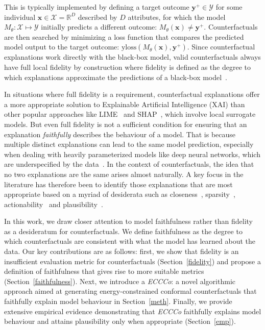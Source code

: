 \documentclass[letterpaper]{article} %
\begin{document}
This is typically implemented by defining a target outcome $\mathbf{y}^+ \in \mathcal{Y}$ for some individual $\mathbf{x} \in \mathcal{X}=\mathbb{R}^D$ described by $D$ attributes, for which the model $M_{\theta}:\mathcal{X}\mapsto\mathcal{Y}$ initially predicts a different outcome: $M_{\theta}(\mathbf{x})\ne \mathbf{y}^+$. Counterfactuals are then searched by minimizing a loss function that compares the predicted model output to the target outcome: $\text{yloss}(M_{\theta}(\mathbf{x}),\mathbf{y}^+)$. Since counterfactual explanations work directly with the black-box model, valid counterfactuals always have full local fidelity by construction where fidelity is defined as the degree to which explanations approximate the predictions of a black-box model~\citep{molnar2022interpretable}. 

In situations where full fidelity is a requirement, counterfactual explanations offer a more appropriate solution to Explainable Artificial Intelligence (XAI) than other popular approaches like LIME~\citep{ribeiro2016why} and SHAP~\citep{lundberg2017unified}, which involve local surrogate models. But even full fidelity is not a sufficient condition for ensuring that an explanation \textit{faithfully} describes the behaviour of a model. That is because multiple distinct explanations can lead to the same model prediction, especially when dealing with heavily parameterized models like deep neural networks, which are underspecified by the data~\citep{wilson2020case}. In the context of counterfactuals, the idea that no two explanations are the same arises almost naturally. A key focus in the literature has therefore been to identify those explanations that are most appropriate based on a myriad of desiderata such as closeness~\citep{wachter2017counterfactual}, sparsity~\citep{schut2021generating}, actionability~\citep{ustun2019actionable} and plausibility~\citep{joshi2019realistic}. 

In this work, we draw closer attention to model faithfulness rather than fidelity as a desideratum for counterfactuals. We define faithfulness as the degree to which counterfactuals are consistent with what the model has learned about the data. Our key contributions are as follows: first, we show that fidelity is an insufficient evaluation metric for counterfactuals (Section~\ref{fidelity}) and propose a definition of faithfulness that gives rise to more suitable metrics (Section~\ref{faithfulness}). Next, we introduce a \textit{ECCCo}: a novel algorithmic approach aimed at generating energy-constrained conformal counterfactuals that faithfully explain model behaviour in Section~\ref{meth}. Finally, we provide extensive empirical evidence demonstrating that \textit{ECCCo} faithfully explains model behaviour and attains plausibility only when appropriate (Section~\ref{emp}).
\end{document}
